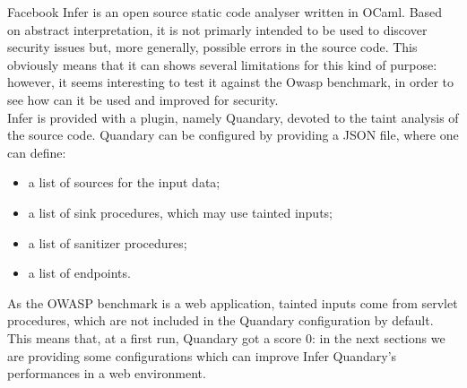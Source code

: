 \documentclass[../Report.tex]{subfiles}
\begin{document}
Facebook Infer is an open source static code analyser written in OCaml. Based on abstract interpretation, it is not primarly intended to be used to discover security issues but, more generally, possible errors in the source code. This obviously means that it can shows several limitations for this kind of purpose: however, it seems interesting to test it against the Owasp benchmark, in order to see how can it be used and improved for security. \\
Infer is provided with a plugin, namely Quandary, devoted to the taint analysis of the source code. Quandary can be configured by providing a JSON file, where one can define:
\begin{itemize}
	\item a list of sources for the input data;
	\item a list of sink procedures, which may use tainted inputs;
	\item a list of sanitizer procedures;
	\item a list of endpoints.
\end{itemize}
As the OWASP benchmark is a web application, tainted inputs come from servlet procedures, which are not included in the Quandary configuration by default. This means that, at a first run, Quandary got a score 0: in the next sections we are providing some configurations which can improve Infer Quandary's performances in a web environment.
\end{document}
